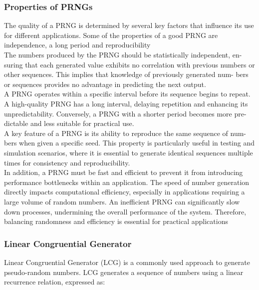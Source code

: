 \subsubsection{Properties of PRNGs}

The quality of a PRNG is determined by several key factors that influence its
use for different applications. Some of the properties of a good PRNG are independence, a long period and reproducibility
\newline \\
The numbers produced by the PRNG should be statistically independent, en-
suring that each generated value exhibits no correlation with previous numbers
or other sequences. This implies that knowledge of previously generated num-
bers or sequences provides no advantage in predicting the next output.
\newline \\
A PRNG operates within a specific interval before its sequence begins to repeat.
A high-quality PRNG has a long interval, delaying repetition and enhancing its
unpredictability. Conversely, a PRNG with a shorter period becomes more pre-
dictable and less suitable for practical use.
\newline \\
A key feature of a PRNG is its ability to reproduce the same sequence of num-
bers when given a specific seed. This property is particularly useful in testing
and simulation scenarios, where it is essential to generate identical sequences
multiple times for consistency and reproducibility.
\newline \\
In addition, a PRNG must be fast and efficient to prevent it from introducing
performance bottlenecks within an application. The speed of number generation
directly impacts computational efficiency, especially in applications requiring a
large volume of random numbers. An inefficient PRNG can significantly slow
down processes, undermining the overall performance of the system. Therefore,
balancing randomness and efficiency is essential for practical applications

\subsubsection{Linear Congruential Generator}

Linear Congruential Generator (LCG) is a commonly used approach to generate
pseudo-random numbers. LCG generates a sequence of numbers using a linear
recurrence relation, expressed as:

